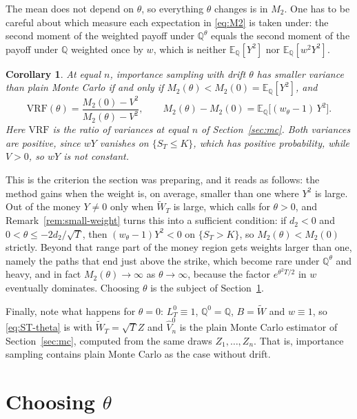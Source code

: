 \documentclass[11pt,a4paper]{article}
\theoremstyle{plain}
\newtheorem{corollary}[theorem]{Corollary}
\theoremstyle{definition}
\theoremstyle{remark}
\newcommand{\E}{\mathbb{E}}
\newcommand{\Q}{\mathbb{Q}}
\newcommand{\1}{\mathbf{1}}
\newcommand{\VRF}{\mathrm{VRF}}
\newcommand{\Wt}{\widetilde{W}}
\newcommand{\Qt}{\Q^{\theta}}
\begin{document}
The mean does not depend on $\theta$, so everything $\theta$ changes is in $M_2$. One has to be careful about which measure each expectation in \eqref{eq:M2} is taken under: the second moment of the weighted payoff under $\Qt$ equals the second moment of the payoff under $\Q$ weighted once by $w$, which is neither $\E_\Q[Y^2]$ nor $\E_\Q[w^2Y^2]$.

\begin{corollary}\label{cor:criterion}
At equal $n$, importance sampling with drift $\theta$ has smaller variance than plain Monte Carlo if and only if $M_2(\theta) < M_2(0) = \E_\Q[Y^2]$, and
\[
  \VRF(\theta) = \frac{M_2(0) - V^2}{M_2(\theta) - V^2},
  \qquad
  M_2(\theta) - M_2(0) = \E_\Q\bigl[(w_\theta - 1)\, Y^2\bigr].
\]
Here $\VRF$ is the ratio of variances at equal $n$ of Section~\ref{sec:mc}. Both variances are positive, since $wY$ vanishes on $\{S_T \le K\}$, which has positive probability, while $V > 0$, so $wY$ is not constant.
\end{corollary}

This is the criterion the section was preparing, and it reads as follows: the method gains when the weight is, on average, smaller than one where $Y^2$ is large. Out of the money $Y \ne 0$ only when $\Wt_T$ is large, which calls for $\theta > 0$, and Remark~\ref{rem:small-weight} turns this into a sufficient condition: if $d_2 < 0$ and $0 < \theta \le -2d_2/\sqrt T$, then $(w_\theta - 1)Y^2 < 0$ on $\{S_T > K\}$, so $M_2(\theta) < M_2(0)$ strictly. Beyond that range part of the money region gets weights larger than one, namely the paths that end just above the strike, which become rare under $\Qt$ and heavy, and in fact $M_2(\theta) \to \infty$ as $\theta \to \infty$, because the factor $e^{\theta^2 T/2}$ in $w$ eventually dominates. Choosing $\theta$ is the subject of Section~\ref{sec:theta}.

Finally, note what happens for $\theta = 0$: $L^0_T \equiv 1$, $\Q^0 = \Q$, $B = \Wt$ and $w \equiv 1$, so \eqref{eq:ST-theta} is \cite[(5.26)]{tfg} with $\Wt_T = \sqrt T Z$ and $\hat V_n^0$ is the plain Monte Carlo estimator of Section~\ref{sec:mc}, computed from the same draws $Z_1, \dots, Z_n$. That is, importance sampling contains plain Monte Carlo as the case without drift.

\section{Choosing \texorpdfstring{$\theta$}{theta}}
\label{sec:theta}
\end{document}
